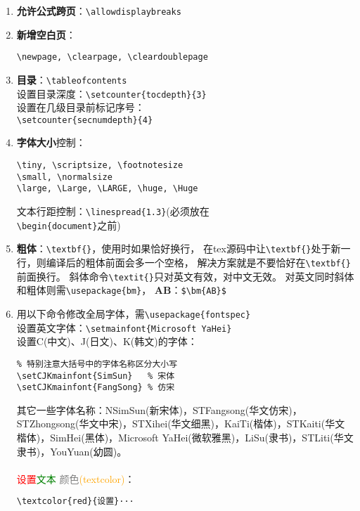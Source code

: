 \documentclass{article}
\renewcommand{\today}{\number\year-\number\month-\number\day}
\begin{document}
\begin{multicols}{2}
\begin{enumerate}
\begin{lstlisting}
\footnotetext{\scriptsize#1}
\renewcommand{\thefootnote}{
\ding{\numexpr171+\value{footnote}}}}    
\end{lstlisting} 


\item \textbf{允许公式跨页}：\verb|\allowdisplaybreaks|

\item \textbf{新增空白页}：
\begin{lstlisting}
\newpage, \clearpage, \cleardoublepage
\end{lstlisting} 


\item \textbf{目录}：\verb|\tableofcontents| \\
设置目录深度：\verb|\setcounter{tocdepth}{3}| \\
设置在几级目录前标记序号：\\ 
\verb|\setcounter{secnumdepth}{4}|

\item \textbf{字体大小}控制：
\begin{lstlisting}
\tiny, \scriptsize, \footnotesize
\small, \normalsize
\large, \Large, \LARGE, \huge, \Huge    
\end{lstlisting} 

文本行距控制：\verb|\linespread{1.3}|(必须放在\\
    \verb|\begin{document}|之前) 

\item \textbf{粗体}：\verb|\textbf{}|，使用时如果恰好换行，
在tex源码中让\verb|\textbf{}|处于新一行，则编译后的粗体前面会多一个空格，
解决方案就是不要恰好在\verb|\textbf{}|前面换行。
斜体命令\verb|\textit{}|只对英文有效，对中文无效。
对英文同时斜体和粗体则需\verb|\usepackage{bm}|，
$ \bm{AB} $：\verb|$\bm{AB}$| 

\item 用以下命令修改全局字体，需\verb|\usepackage{fontspec}|\\
设置英文字体：\verb|\setmainfont{Microsoft YaHei}|\\
设置C(中文)、J(日文)、K(韩文)的字体：
\begin{lstlisting}
% 特别注意大括号中的字体名称区分大小写
\setCJKmainfont{SimSun}   % 宋体
\setCJKmainfont{FangSong} % 仿宋
\end{lstlisting} 
其它一些字体名称：NSimSun(新宋体)，STFangsong(华文仿宋)，STZhongsong(华文中宋)，STXihei(华文细黑)，KaiTi(楷体)，STKaiti(华文楷体)，SimHei(黑体)，Microsoft YaHei(微软雅黑)，LiSu(隶书)，STLiti(华文隶书)，YouYuan(幼圆)。\\
\\
\textcolor{red}{设置}\textcolor{green}{文本}
\textcolor{gray}{颜色}\textcolor{orange}{(textcolor)}：
\begin{lstlisting}
\textcolor{red}{设置}···
\end{lstlisting} 


\end{enumerate}
\end{multicols}
\end{document}
